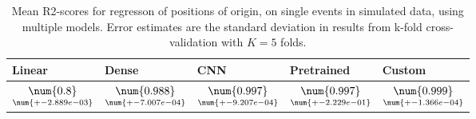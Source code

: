 \begin{table}
\centering
\caption{
Mean R2-scores for regresson of positions of origin, on single events in simulated data, using multiple models. 
Error estimates are the standard deviation in results from k-fold cross-validation 
with $K=5$ folds.
}
\label{tab:regression-simulated-single-position-r2}
\begin{tabular}{lllll}
\toprule
                                           Linear &                                               Dense &                                                 CNN &                                          Pretrained &                                              Custom \\
\midrule
 $\underset{\num{+- 2.889e-03 }  }{\num{ 0.8 } }$ &  $\underset{\num{+- 7.007e-04 }  }{\num{ 0.988 } }$ &  $\underset{\num{+- 9.207e-04 }  }{\num{ 0.997 } }$ &  $\underset{\num{+- 2.229e-01 }  }{\num{ 0.997 } }$ &  $\underset{\num{+- 1.366e-04 }  }{\num{ 0.999 } }$ \\
\bottomrule
\end{tabular}
\end{table}
